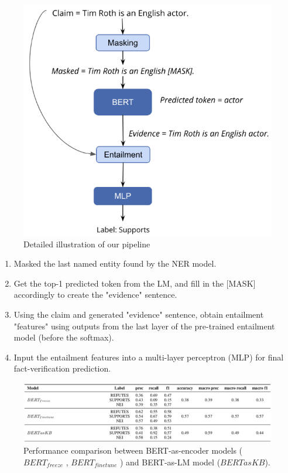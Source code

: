 \documentclass[10pt, english]{report}
\begin{document}
\begin{figure}[H]
	\centering
	\includegraphics[scale=0.4]{img/LM_detailed_pipline.png}
	\caption{Detailed illustration of our pipeline \cite{lee2020language}}
\end{figure}

\begin{enumerate}
\item Masked the last named entity found by the NER model.
\item Get the top-1 predicted token from the LM, and fill in the [MASK] accordingly to create the "evidence" sentence.
\item Using the claim and generated "evidence" sentence, obtain entailment "features" using outputs from the last layer of the pre-trained entailment model (before the softmax).
\item Input the entailment features into a multi-layer perceptron (MLP) for final fact-verification prediction.
\end{enumerate}

\begin{figure}[H]
	\centering
	\includegraphics[scale=0.4]{img/bert_lm_evaluation.png}
	\caption{Performance comparison between BERT-as-encoder models ($BERT_{freeze}$ , $BERT_{finetune}$ ) and BERT-as-LM model ($BERTasKB$). \cite{lee2020language}}
\end{figure}
\end{document}
